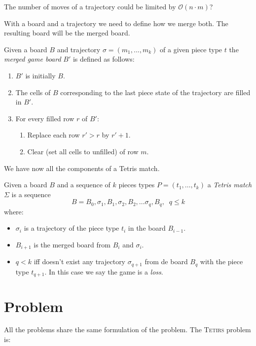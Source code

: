 The number of moves of a trajectory could be limited by $\mathcal{O}(n \cdot m)$?

With a board and a trajectory we need to define how we merge both. The resulting board will be the merged board. 

\begin{definition}
  Given a board $B$ and trajectory $\sigma = (m_1, ..., m_k)$ of a given piece type $t$ the \emph{merged game board} $B'$ is defined as follows:
  \begin{enumerate}
    \item $B'$ is initially $B$.
    \item The cells of $B$ corresponding to the last piece state of the trajectory are filled in $B'$.
    \item For every filled row $r$ of $B'$:
      \begin{enumerate}
        \item Replace each row $r' > r$ by $r'+1$.
        \item Clear (set all cells to unfilled) of row $m$.
      \end{enumerate}
  \end{enumerate}
\end{definition}

We have now all the components of a Tetris match.

\begin{definition}
  Given a board $B$ and a sequence of $k$ pieces types $P = (t_1,\dots,t_k)$ a \emph{Tetris match} $\Sigma$ is a sequence
  $$ B = B_0, \sigma_1, B_1, \sigma_2, B_2, \dots  \sigma_q, B_q, \; \; q \leq k$$ 
  where:
  \begin{itemize}
    \item $\sigma_i$ is a trajectory of the piece type $t_i$ in the board $B_{i-1}$.
    \item $B_{i+1}$ is the merged board from $B_i$ and $\sigma_i$.
    \item $q < k$ iff doesn't exist any trajectory $\sigma_{q+1}$ from de board $B_q$ with the piece type $t_{q+1}$. In this case we say the game is a \emph{loss}.
  \end{itemize}
\end{definition}

\section{Problem}

All the problems share the same formulation of the problem. The \textsc{Tetirs} problem is:

